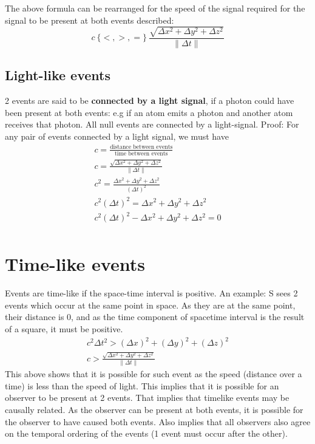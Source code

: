 \documentclass[10pt]{report}
\begin{document}
{{The above formula can be rearranged for the speed of the signal required for the signal to be present at both events described:
\[
c\ \{<, >, =\}\ \frac{\sqrt{\Delta x^2 + \Delta y^{2}+\Delta z^{2}}}{\|\Delta t\|}
\] 

}
\subsection{Light-like events}
\par{2 events are said to be \textbf{connected by a light signal}, if a photon could have been present at both events: e.g if an atom emits a photon and another atom receives that photon. All null events are connected by a light-signal. Proof: For any pair of events connected by a light signal, we must have
	\begin{align*}
		c=\frac{\text{distance between events}}{\text{time between events}} \\
		c=\frac{\sqrt{\Delta x^{2}+\Delta y^{2}+\Delta z^{2}}}{\|\Delta t\|} \\
		c^{2}=\frac{\Delta x^{2}+\Delta y^{2}+\Delta z^{2}}{\left(\Delta t\right)^{2}} \\
		c^{2}\left(\Delta t\right)^{2}=\Delta x^{2}+\Delta y^{2}+\Delta z^{2} \\
		c^{2}\left(\Delta t\right)^{2}-\Delta x^{2}+\Delta y^{2}+\Delta z^{2}=0 \\
	\end{align*}
}
\section{Time-like events}
\par{Events are time-like if the space-time interval is positive. An example: S sees 2 events which occur at the same point in space. As they are at the same point, their distance is 0, and as the time component of spacetime interval is the result of a square, it must be positive.
\begin{align*}
	c^{2}\Delta t^{2}>\left(\Delta x\right)^{2}+\left(\Delta y\right)^{2}+\left(\Delta z\right)^{2} \\
	c>\frac{\sqrt{\Delta x^{2}+\Delta y^{2}+ \Delta z^{2}}}{\|\Delta t\|}
\end{align*}
This above shows that it is possible for such event as the speed (distance over a time) is less than the speed of light. This implies that it is possible for an observer to be present at 2 events. That implies that timelike events may be causally related. As the observer can be present at both events, it is possible for the observer to have caused both events. Also implies that all observers also agree on the temporal ordering of the events (1 event must occur after the other). }
}
\end{document}
